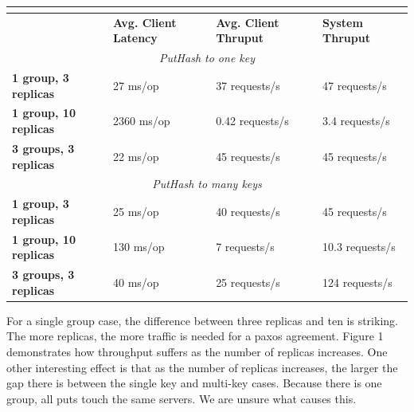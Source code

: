 \documentclass[letterpaper,10pt]{article}
\begin{document}
\begin{table}[h]
\begin{tabular}{|l|l|l|l|}
\hline
\multicolumn{4}{|c|}{\cellcolor[HTML]{C0C0C0}{\color[HTML]{000000} \textbf{Multipaxos}}}                              \\ \hline
                              & \textbf{Avg. Client Latency} & \textbf{Avg. Client Thruput} & \textbf{System Thruput} \\ \hline
\multicolumn{4}{|c|}{\textit{PutHash to one key}}                                                                     \\ \hline
\textbf{1 group, 3 replicas}  & 27 ms/op                     & 37 requests/s                & 47 requests/s           \\ \hline
\textbf{1 group, 10 replicas} & 2360 ms/op                   & 0.42 requests/s              & 3.4 requests/s          \\ \hline
\textbf{3 groups, 3 replicas} & 22 ms/op                     & 45 requests/s                & 45 requests/s           \\ \hline
\multicolumn{4}{|c|}{\textit{PutHash to many keys}}                                                                   \\ \hline
\textbf{1 group, 3 replicas}  & 25 ms/op                     & 40 requests/s                & 45 requests/s           \\ \hline
\textbf{1 group, 10 replicas} & 130 ms/op                    & 7 requests/s                 & 10.3 requests/s         \\ \hline
\textbf{3 groups, 3 replicas} & 40 ms/op                     & 25 requests/s                & 124 requests/s          \\ \hline
\end{tabular}
\end{table}

For a single group case, the difference between three replicas and ten is
striking. The more replicas, the more traffic is needed for a paxos
agreement. Figure 1 demonstrates how throughput suffers as the number
of replicas increases. One other interesting effect is that as the
number of replicas increases, the larger the gap there is between the
single key and multi-key cases. Because there is one group, all puts
touch the same servers. We are unsure what causes this.
\end{document}

